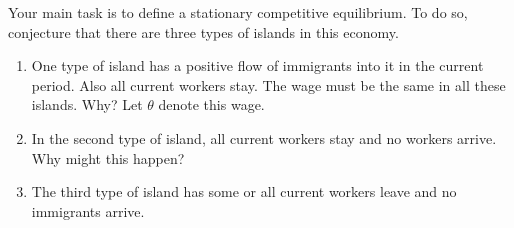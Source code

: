 \documentclass[11pt,english]{article}
\begin{document}
Your main task is to define a stationary competitive equilibrium. To do so,
conjecture that there are three types of islands in this economy.
 
\begin{enumerate}
    \item One type of island has a positive flow of immigrants into it in the
        current period. Also all current workers stay. The wage must be the same
        in all these islands. Why? Let $\theta$ denote this wage.
 
    \item In the second type of island, all current workers stay and no workers
        arrive. Why might this happen?
 
    \item The third type of island has some or all current workers leave and no
        immigrants arrive.
\end{enumerate}
 
\end{document}
